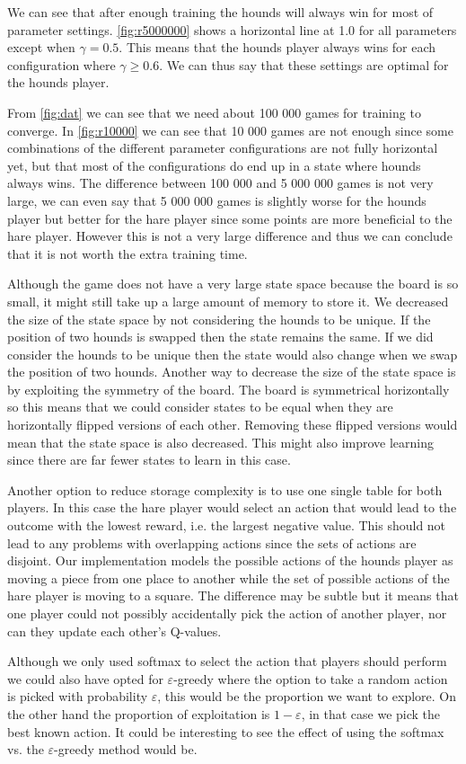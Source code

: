 We can see that after enough training the hounds will always win for most of
parameter settings. \autoref{fig:r5000000} shows a horizontal line at 1.0 for
all parameters except when $\gamma = 0.5$. This means that the hounds player
always wins for each configuration where $\gamma \geq 0.6$. We can thus say
that these settings are optimal for the hounds player.

From \autoref{fig:dat} we can see that we need about 100 000 games for training
to converge. In \autoref{fig:r10000} we can see that 10 000 games are not enough
since some combinations of the different parameter configurations are not fully
horizontal yet, but that most of the configurations do end up in a state where
hounds always wins. The difference between 100 000 and 5 000 000 games is not
very large, we can even say that 5 000 000 games is slightly worse for the
hounds player but better for the hare player since some points are more
beneficial to the hare player. However this is not a very large difference and
thus we can conclude that it is not worth the extra training time.

Although the game does not have a very large state space because the board is
so small, it might still take up a large amount of memory to store it. We
decreased the size of the state space by not considering the hounds to be
unique. If the position of two hounds is swapped then the state remains the
same. If we did consider the hounds to be unique then the state would also
change when we swap the position of two hounds. Another way to decrease the
size of the state space is by exploiting the symmetry of the board. The board
is symmetrical horizontally so this means that we could consider states to be
equal when they are horizontally flipped versions of each other. Removing these
flipped versions would mean that the state space is also decreased. This might
also improve learning since there are far fewer states to learn in this case.

Another option to reduce storage complexity is to use one single table for both
players. In this case the hare player would select an action that would lead
to the outcome with the lowest reward, i.e. the largest negative value. This
should not lead to any problems with overlapping actions since the sets of
actions are disjoint. Our implementation models the possible actions of the
hounds player as moving a piece from one place to another while the set of
possible actions of the hare player is moving to a square. The difference
may be subtle but it means that one player could not possibly accidentally
pick the action of another player, nor can they update each other's Q-values.

Although we only used softmax to select the action that players should perform
we could also have opted for $\varepsilon$-greedy where the option to take a
random action is picked with probability $\varepsilon$, this would be the
proportion we want to explore. On the other hand the proportion of exploitation
is $1-\varepsilon$, in that case we pick the best known action. It could be
interesting to see the effect of using the softmax vs. the $\varepsilon$-greedy
method would be.
